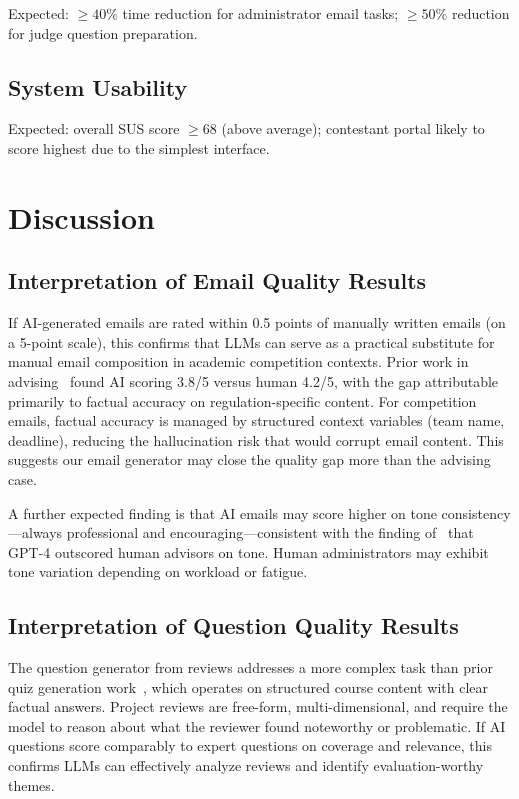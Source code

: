 \documentclass[runningheads]{llncs}
\begin{document}
Expected: $\geq 40\%$ time reduction for administrator email tasks; $\geq 50\%$ reduction for judge question preparation.

\subsection{System Usability}

Expected: overall SUS score $\geq 68$ (above average); contestant portal likely to score highest due to the simplest interface.

\section{Discussion}

\subsection{Interpretation of Email Quality Results}

If AI-generated emails are rated within 0.5 points of manually written emails (on a 5-point scale), this confirms that LLMs can serve as a practical substitute for manual email composition in academic competition contexts. Prior work in advising~\cite{ref_augmented_advising} found AI scoring 3.8/5 versus human 4.2/5, with the gap attributable primarily to factual accuracy on regulation-specific content. For competition emails, factual accuracy is managed by structured context variables (team name, deadline), reducing the hallucination risk that would corrupt email content. This suggests our email generator may close the quality gap more than the advising case.

A further expected finding is that AI emails may score higher on tone consistency---always professional and encouraging---consistent with the finding of~\cite{ref_augmented_advising} that GPT-4 outscored human advisors on tone. Human administrators may exhibit tone variation depending on workload or fatigue.

\subsection{Interpretation of Question Quality Results}

The question generator from reviews addresses a more complex task than prior quiz generation work~\cite{ref_quiz_gen}, which operates on structured course content with clear factual answers. Project reviews are free-form, multi-dimensional, and require the model to reason about what the reviewer found noteworthy or problematic. If AI questions score comparably to expert questions on coverage and relevance, this confirms LLMs can effectively analyze reviews and identify evaluation-worthy themes.
\end{document}
